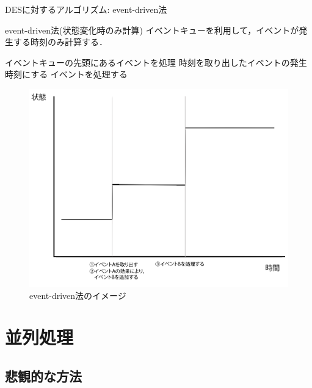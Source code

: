 \documentclass[dvipdfmx,uplatex,11pt]{beamer}
\theoremstyle{definition}
\begin{document}
\begin{frame}{DESに対するアルゴリズム: event-driven法}
  \begin{block}{event-driven法(状態変化時のみ計算)}
    イベントキューを利用して，イベントが発生する時刻のみ計算する．
    \begin{algorithmic}[1]
      \STATE イベントキューの先頭にあるイベントを処理
      \STATE 時刻を取り出したイベントの発生時刻にする
      \STATE イベントを処理する
      \ENDWHILE
    \end{algorithmic}
  \end{block}

  \begin{figure}[htb]
    \includegraphics[scale=0.1]{event_driven_method.png}
    \caption{event-driven法のイメージ}
  \end{figure}

\end{frame}
\section{並列処理}

\subsection{悲観的な方法}
\end{document}
